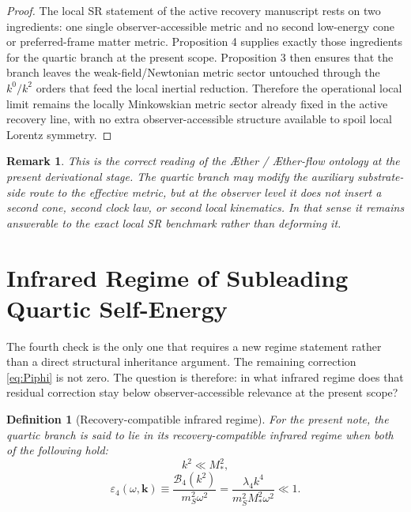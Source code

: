 \documentclass[11pt]{article}
\newcommand{\Aether}{\AE{}ther}
\newcommand{\Aflow}{\AE{}ther-flow}
\newtheorem{definition}{Definition}
\newtheorem{remark}{Remark}
\begin{document}
\begin{proof}
The local SR statement of the active recovery manuscript rests on two ingredients: one single observer-accessible metric and no second low-energy cone or preferred-frame matter metric. Proposition 4 supplies exactly those ingredients for the quartic branch at the present scope. Proposition 3 then ensures that the branch leaves the weak-field/Newtonian metric sector untouched through the \(k^0/k^2\) orders that feed the local inertial reduction. Therefore the operational local limit remains the locally Minkowskian metric sector already fixed in the active recovery line, with no extra observer-accessible structure available to spoil local Lorentz symmetry.
\end{proof}

\begin{remark}
This is the correct reading of the \Aether{} / \Aflow{} ontology at the present derivational stage. The quartic branch may modify the auxiliary substrate-side route to the effective metric, but at the observer level it does not insert a second cone, second clock law, or second local kinematics. In that sense it remains answerable to the exact local SR benchmark rather than deforming it.
\end{remark}

\section{Infrared Regime of Subleading Quartic Self-Energy}

The fourth check is the only one that requires a new regime statement rather than a direct structural inheritance argument. The remaining correction \eqref{eq:Piphi} is not zero. The question is therefore: in what infrared regime does that residual correction stay below observer-accessible relevance at the present scope?

\begin{definition}[Recovery-compatible infrared regime]
For the present note, the quartic branch is said to lie in its recovery-compatible infrared regime when both of the following hold:
\begin{equation}
k^2\ll M_*^2,
\label{eq:irhierarchy1}
\end{equation}
\begin{equation}
\varepsilon_4(\omega,\mathbf{k})
\equiv
\frac{\mathcal B_4(k^2)}{m_S^2\omega^2}
=
\frac{\lambda_4 k^4}{m_S^2M_*^2\omega^2}
\ll 1.
\label{eq:epsilon4}
\end{equation}
\end{definition}
\end{document}
